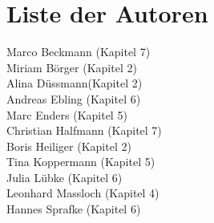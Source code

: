 \chapter*{Liste der Autoren}
Marco Beckmann (Kapitel 7)\\
Miriam Börger (Kapitel 2)\\
Alina Düssmann(Kapitel 2)\\
Andreas Ebling (Kapitel 6)\\
Marc Enders (Kapitel 5)\\
Christian Halfmann (Kapitel 7)\\
Boris Heiliger (Kapitel 2)\\
Tina Koppermann (Kapitel 5)\\
Julia Lübke (Kapitel 6)\\
Leonhard Massloch (Kapitel 4)\\
Hannes Sprafke (Kapitel 6)\\
